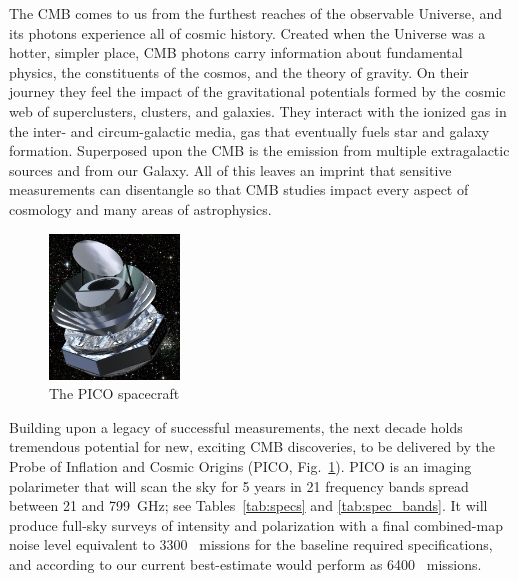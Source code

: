 \documentclass[PICOAPC.tex]{subfiles}
\begin{document}

The \ac{CMB} comes to us from the furthest reaches of the observable Universe, and its photons experience all of cosmic history.  Created when the Universe was a hotter, simpler place, CMB photons carry information about fundamental physics, the constituents of the cosmos, and the theory of gravity.  On their journey they feel the impact of the gravitational potentials formed by the cosmic web of superclusters, clusters, and galaxies.  They interact with the ionized gas in the inter- and circum-galactic media, gas that eventually fuels star and galaxy formation.  Superposed upon the CMB is the emission from multiple extragalactic sources and from our Galaxy.  All of this leaves an imprint that sensitive measurements can disentangle so that CMB studies impact every aspect of cosmology and many areas of astrophysics.

\begin{figure}  %
\vspace{-5pt} %
\includegraphics[width=0.31\textwidth]{images/PICO_Image.jpg}
\vspace{-0.25in}
\caption{\captiontext The PICO spacecraft 
\label{fig:pico_rendered} }
\end{figure}

Building upon a legacy of successful measurements, the next decade holds tremendous potential for new, exciting \ac{CMB} discoveries, to be delivered by the Probe of Inflation and Cosmic Origins (PICO, Fig.~\ref{fig:pico_rendered}). PICO is an imaging polarimeter that will scan the sky for 5 years in 21 frequency bands spread between 21 and 799~GHz; see Tables~\ref{tab:specs} and \ref{tab:spec_bands}. It will produce %
full-sky surveys of intensity and polarization with a final combined-map noise level equivalent to 3300 \planck\ missions for the baseline required specifications, and according to our current best-estimate would perform as 6400 \planck\ missions.  
\end{document}
